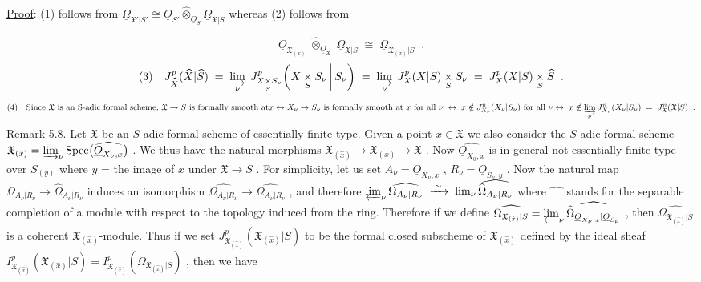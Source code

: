 \underline{Proof}: (1) follows from $\underline{\Omega}_{\mathfrak{X}'|S'} \cong \underline{O}_{S'} \widehat{\otimes}_{\underline{O}_S} \underline{\Omega}_{\mathfrak{X}|S}$ whereas (2) follows from

\begin{equation*}
\underline{O}_{\mathfrak{X}_{(x)}} \;\widehat{\otimes}_{\underline{O}_{\mathfrak{X}}}\; \underline{\Omega}_{\mathfrak{X}|S} \;\cong\; \underline{\Omega}_{\mathfrak{X}_{(x)}|S} \;\;.
\end{equation*}
\begin{equation*}
(3)\quad J^{p}_{\widehat{X}}(\widehat{X}|\widehat{S}) \;=\; \varinjlim_{\nu} \; J^{p}_{X \underset{S}{\times} S_\nu}\!\left(X \underset{S}{\times} S_\nu \,\middle|\, S_\nu\right) \;=\; \varinjlim_{\nu} \; J^{p}_{X}(X|S) \underset{S}{\times} S_\nu \;=\; J^{p}_{X}(X|S) \underset{S}{\times} \widehat{S} \;\;.
\end{equation*}
\begin{equation*}
(4)\quad \text{Since } \mathfrak{X} \text{ is an S-adic formal scheme, } \mathfrak{X} \to S \text{ is formally smooth at}\\ x \leftrightarrow X_\nu \to S_\nu \text{ is formally smooth at } x \text{ for all } \nu \;\leftrightarrow\; x \notin J^{n}_{X_\nu}(X_\nu|S_\nu) \text{ for all } \nu\\ \leftrightarrow\; x \notin \varinjlim_{\nu} J^{n}_{X_\nu}(X_\nu|S_\nu) \;=\; J^{n}_{\mathfrak{X}}(\mathfrak{X}|S) \;\;.
\end{equation*}
\underline{Remark} 5.8. Let $\mathfrak{X}$ be an $S$-adic formal scheme of essentially finite type. Given a point $x \in \mathfrak{X}$ we also consider the $S$-adic formal scheme $\mathfrak{X}_{(\hat{x})} = \varinjlim_{\nu} \mathrm{Spec}\big(\widehat{\underline{O}_{X_\nu,x}}\big)$ . We thus have the natural morphisms $\mathfrak{X}_{(\hat{x})} \to \mathfrak{X}_{(x)} \to \mathfrak{X}$ . Now $\widehat{\underline{O}_{X_0,x}}$ is in general not essentially finite type over $S_{(y)}$ where $y$ = the image of $x$ under $\mathfrak{X} \to S$ . For simplicity, let us set $A_\nu = \underline{O}_{X_\nu,x}$ , $R_\nu = \underline{O}_{S_\nu,y}$ . Now the natural map $\Omega_{A_\nu|R_\nu} \to \widehat{\Omega}_{A_\nu|R_\nu}$ induces an isomorphism $\widehat{\Omega_{A_\nu|R_\nu}} \to \widehat{\Omega_{A_\nu|R_\nu}}$ , and therefore $\varprojlim_{\nu} \widehat{\Omega_{A_\nu|R_\nu}} \;\xrightarrow{\;\sim\;}\; \lim_{\nu} \widehat{\widehat{\Omega}_{A_\nu|R_\nu}}$ where $\widehat{\phantom{xx}}$ stands for the separable completion of a module with respect to the topology induced from the ring. Therefore if we define $\widehat{\Omega_{\mathfrak{X}_{(\hat{x})}|S}} = \varprojlim_{\nu} \widehat{\widehat{\Omega}_{\underline{O}_{X_\nu,x}|\underline{O}_{S_\nu}}}$ , then $\widehat{\Omega_{\mathfrak{X}_{(\hat{x})}|S}}$ is a coherent $\mathfrak{X}_{(\hat{x})}$-module. Thus if
we set $J^{p}_{\mathfrak{X}_{(\hat{x})}}(\mathfrak{X}_{(\hat{x})}|S)$ to be the formal closed subscheme of $\mathfrak{X}_{(\hat{x})}$ defined by the ideal sheaf $I^{p}_{\mathfrak{X}_{(\hat{x})}}(\mathfrak{X}_{(\hat{x})}|S) = I^{p}_{\mathfrak{X}_{(\hat{x})}}(\Omega_{\mathfrak{X}_{(\hat{x})}|S})$ , then we have

